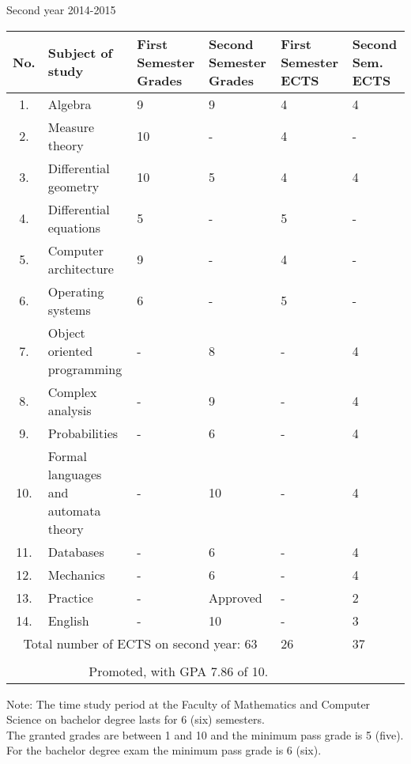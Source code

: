 \documentclass[a4paper,9pt,final]{scrartcl}
\begin{document}
\begin{center}
	Second year 2014-2015
	\begin{longtable}{|c|m{6cm}|m{1.5cm}|m{1.5cm}|m{1.5cm}|m{1.5cm}|}
		\hline
		No. & Subject of study & First Semester Grades & Second Semester Grades & First Semester ECTS & Second Sem. ECTS\\
		\hline
		\hline
		1. & Algebra & 9 & 9 & 4 & 4 \\ \hline
		2. & Measure theory & 10 & - & 4 & - \\ \hline
		3. & Differential geometry & 10 & 5 & 4 & 4 \\ \hline
		4. & Differential equations & 5 & - & 5 & -\\ \hline
		5. & Computer architecture & 9 & - & 4 & - \\ \hline
		6. & Operating systems & 6 & - & 5 & - \\ \hline
		7. & Object oriented programming & - & 8 & - & 4 \\ \hline
		8. & Complex analysis & - & 9 & - & 4 \\ \hline 
		9. & Probabilities & - & 6 & - & 4 \\ \hline
		10. & Formal languages and automata theory & - & 10 & - & 4 \\ \hline
		11. & Databases & - & 6 & - & 4 \\ \hline
		12. & Mechanics & - & 6 & - & 4 \\ \hline
		13. & Practice & - & Approved & - & 2 \\ \hline
		14. & English & - & 10 & - & 3 \\ \hline
		\multicolumn{4}{|c|}{Total number of ECTS on second year: 63} & 26 & 37 \\ \hline
			\multicolumn{6}{c}{} \\ 
			\multicolumn{4}{r}{Promoted, with GPA 7.86 of 10.}
				
	\end{longtable}
\end{center}

\newpage

\begin{small}
	Note: The time study period at the Faculty of Mathematics and Computer Science on bachelor degree lasts for
6 (six) semesters. \\
The granted grades are between 1 and 10 and the minimum
pass grade is 5 (five). For the bachelor degree exam the minimum pass grade is 6 (six).
\end{small}
\end{document}
